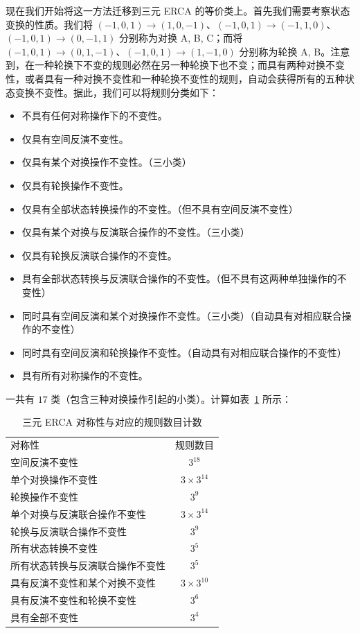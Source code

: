 \documentclass[reprint, amsmath, amssymb, aps, physrev,prb]{revtex4-2}
\begin{document}
现在我们开始将这一方法迁移到三元 ERCA 的等价类上。首先我们需要考察状态变换的性质。我们将 $(-1,0,1) \to (1,0,-1)$、$(-1,0,1) \to (-1,1,0)$、$(-1,0,1) \to (0,-1,1)$ 分别称为对换 A, B, C；而将 $(-1,0,1) \to (0,1,-1)$、$(-1,0,1) \to (1,-1,0)$ 分别称为轮换 A, B。注意到，在一种轮换下不变的规则必然在另一种轮换下也不变；而具有两种对换不变性，或者具有一种对换不变性和一种轮换不变性的规则，自动会获得所有的五种状态变换不变性。据此，我们可以将规则分类如下：
\begin{itemize}
\item 不具有任何对称操作下的不变性。
\item 仅具有空间反演不变性。
\item 仅具有某个对换操作不变性。（三小类）
\item 仅具有轮换操作不变性。
\item 仅具有全部状态转换操作的不变性。（但不具有空间反演不变性）
\item 仅具有某个对换与反演联合操作的不变性。（三小类）
\item 仅具有轮换反演联合操作的不变性。
\item 具有全部状态转换与反演联合操作的不变性。（但不具有这两种单独操作的不变性）
\item 同时具有空间反演和某个对换操作不变性。（三小类）（自动具有对相应联合操作的不变性）
\item 同时具有空间反演和轮换操作不变性。（自动具有对相应联合操作的不变性）
\item 具有所有对称操作的不变性。
\end{itemize}
一共有 $17$ 类（包含三种对换操作引起的小类）。计算如表~\ref{tab:ternary_count} 所示：

\begin{table}[htbp]
\caption{\label{tab:ternary_count} 三元 ERCA 对称性与对应的规则数目计数}
\begin{ruledtabular}
\begin{tabular}{lc}
对称性 & 规则数目 \\
\colrule
空间反演不变性 & $3^{18}$ \\
单个对换操作不变性 & $3 \times 3^{14}$ \\
轮换操作不变性 & $3^9$ \\
单个对换与反演联合操作不变性 & $3 \times 3^{14}$ \\
轮换与反演联合操作不变性 & $3^9$ \\
所有状态转换不变性 & $3^5$ \\
所有状态转换与反演联合操作不变性 & $3^5$ \\
具有反演不变性和某个对换不变性 & $3 \times 3^{10}$ \\
具有反演不变性和轮换不变性 & $3^6$ \\
具有全部不变性 & $3^4$ \\
\end{tabular}
\end{ruledtabular}
\end{table}
\end{document}
